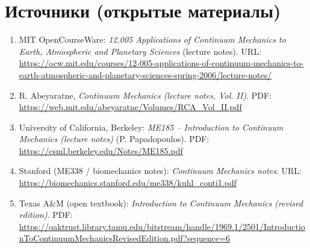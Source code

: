 \documentclass[12pt,a4paper]{article}
\begin{document}
\section*{Источники (открытые материалы)}
\begin{enumerate}
    \item MIT OpenCourseWare: \textit{12.005 Applications of Continuum Mechanics to Earth, Atmospheric and Planetary Sciences} (lecture notes).  
    URL: \url{https://ocw.mit.edu/courses/12-005-applications-of-continuum-mechanics-to-earth-atmospheric-and-planetary-sciences-spring-2006/lecture-notes/}
    \vspace{2mm}
    \item R. Abeyaratne, \textit{Continuum Mechanics (lecture notes, Vol. II)}.  
    PDF: \url{https://web.mit.edu/abeyaratne/Volumes/RCA_Vol_II.pdf}
    \vspace{2mm}
    \item University of California, Berkeley: \textit{ME185 -- Introduction to Continuum Mechanics (lecture notes)} (P. Papadopoulos).  
    PDF: \url{https://csml.berkeley.edu/Notes/ME185.pdf}
    \vspace{2mm}
    \item Stanford (ME338 / biomechanics notes): \textit{Continuum Mechanics notes}.  
    URL: \url{https://biomechanics.stanford.edu/me338/kuhl_conti1.pdf}
    \vspace{2mm}
    \item Texas A\&M (open textbook): \textit{Introduction to Continuum Mechanics (revised edition)}.  
    PDF: \url{https://oaktrust.library.tamu.edu/bitstream/handle/1969.1/2501/IntroductionToContinuumMechanicsRevisedEdition.pdf?sequence=6}
\end{enumerate}
\end{document}
